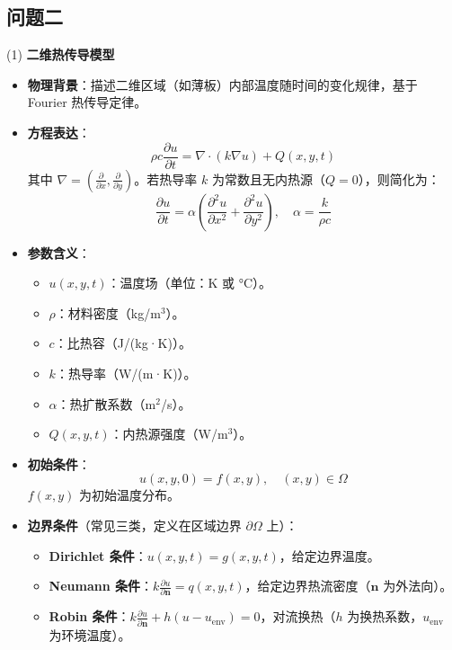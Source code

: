 \documentclass[UTF8]{article}
\begin{document}
\subsection*{问题二}
\vspace{0.5em}

(1) \textbf{二维热传导模型}

\begin{itemize}[leftmargin=1.5em]
    \item \textbf{物理背景}：描述二维区域（如薄板）内部温度随时间的变化规律，基于 Fourier 热传导定律。
    \item \textbf{方程表达}：
    \begin{equation}
        \rho c \frac{\partial u}{\partial t} = \nabla \cdot (k \nabla u) + Q(x,y,t)
    \end{equation}
    其中 $\nabla = \left( \frac{\partial}{\partial x}, \frac{\partial}{\partial y} \right)$。若热导率 $k$ 为常数且无内热源（$Q=0$），则简化为：
    \begin{equation}
        \frac{\partial u}{\partial t} = \alpha \left( \frac{\partial^2 u}{\partial x^2} + \frac{\partial^2 u}{\partial y^2} \right), \quad \alpha = \frac{k}{\rho c}
    \end{equation}
    \item \textbf{参数含义}：
    \begin{itemize}
        \item $u(x,y,t)$：温度场（单位：K 或 °C）。
        \item $\rho$：材料密度（kg/m$^3$）。
        \item $c$：比热容（J/(kg·K)）。
        \item $k$：热导率（W/(m·K)）。
        \item $\alpha$：热扩散系数（m$^2$/s）。
        \item $Q(x,y,t)$：内热源强度（W/m$^3$）。
    \end{itemize}
    \item \textbf{初始条件}：
    \begin{equation}
        u(x,y,0) = f(x,y), \quad (x,y) \in \Omega
    \end{equation}
    $f(x,y)$ 为初始温度分布。
    \item \textbf{边界条件}（常见三类，定义在区域边界 $\partial \Omega$ 上）：
    \begin{itemize}
        \item \textbf{Dirichlet 条件}：$u(x,y,t) = g(x,y,t)$，给定边界温度。
        \item \textbf{Neumann 条件}：$k \frac{\partial u}{\partial \mathbf{n}} = q(x,y,t)$，给定边界热流密度（$\mathbf{n}$ 为外法向）。
        \item \textbf{Robin 条件}：$k \frac{\partial u}{\partial \mathbf{n}} + h(u - u_{\text{env}}) = 0$，对流换热（$h$ 为换热系数，$u_{\text{env}}$ 为环境温度）。
    \end{itemize}
\end{itemize}
\end{document}
